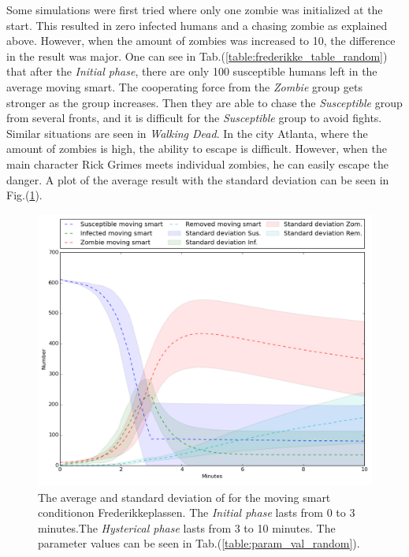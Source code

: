 \documentclass[%
twoside,                 %
final,                   %
chapterprefix=true,      %
open=right               %
10pt]{book}
\begin{document}
Some simulations were first tried where only one zombie was initialized at the start. This resulted in zero infected humans and a chasing zombie as explained above. However, when the amount of zombies was increased to 10, the difference in the result was major. One can see in Tab.(\ref{table:frederikke_table_random}) that after the \emph{Initial phase}, there are only 100 susceptible humans left in the average moving smart. The cooperating force from the \emph{Zombie} group gets stronger as the group increases. Then they are able to chase the \emph{Susceptible} group from several fronts, and it is difficult for the \emph{Susceptible} group to avoid fights. Similar situations are seen in \emph{Walking Dead}. In the city Atlanta, where the amount of zombies is high, the ability to escape is difficult. However, when the main character Rick Grimes meets individual zombies, he can easily escape the danger. A plot of the average result with the standard deviation can be seen in Fig.(\ref{fig:average_moving_smart}). 


\vspace{3mm}




\vspace{3mm}




\begin{figure}[ht]
  \centerline{\includegraphics[width=0.8\linewidth]{3_fig/Moving_smart_average.png}}
  \caption{
  \label{fig:average_moving_smart} The average and standard deviation of for the moving smart conditionon Frederikkeplassen. The \emph{Initial phase} lasts from 0 to 3 minutes.The \emph{Hysterical phase} lasts from 3 to 10 minutes. The parameter values can be seen in Tab.(\ref{table:param_val_random}).
  }
\end{figure}
\end{document}
